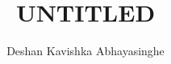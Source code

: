 \documentclass[11pt,a4paper,hyperpdf,oneside,nobind]{AJBthesis}
\title{\texorpdfstring{UNTITLED}{UNTITLED}}
\author{Deshan Kavishka Abhayasinghe}
\begin{document}
\begin{frontmatter}
    
\end{frontmatter}

\begin{mainmatter}
    \linenumbers
     
\end{mainmatter}

\clearpage

\begin{backmatter}
     
     
        
\end{backmatter}

\let\svaddcontentsline\addcontentsline
    \renewcommand\addcontentsline[3]{%
        \edef\qtest{#1}%
        \def\qmatch{lof}%
        \ifx\qmatch\qtest\else%
            \def\qmatch{lot}%
            \ifx\qmatch\qtest\else%
                \svaddcontentsline{#1}{#2}{#3}%
        \fi\fi%
    }

\begin{appendices}
\end{appendices}
\end{document}
